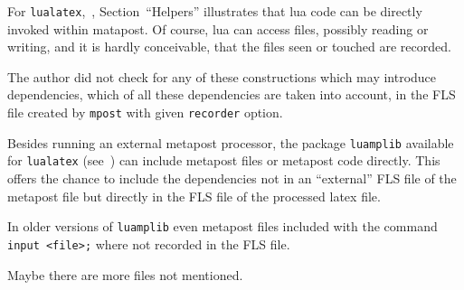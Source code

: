 \documentclass[a4paper, english]{article}%
\begin{document}
For \texttt{lualatex},~\cite{LuaInMp}, 
Section~``Helpers'' illustrates that lua code can be directly invoked within matapost. 
Of course, lua can access files, possibly reading or writing, and it is hardly conceivable, 
that the files seen or touched are recorded. 

The author did not check for any of these constructions which may introduce dependencies, 
which of all these dependencies are taken into account, 
in the FLS file created by \texttt{mpost} with given \texttt{recorder} option. 

Besides running an external metapost processor, 
the package \texttt{luamplib} available for \texttt{lualatex} (see~\cite{LuaMpLib})
can include metapost files or metapost code directly. 
This offers the chance 
to include the dependencies not in an ``external'' FLS file of the metapost file
but directly in the FLS file of the processed latex file. 

In older versions of \texttt{luamplib} 
even metapost files included with the command \texttt{input <file>;} 
where not recorded in the FLS file. 

Maybe there are more files not mentioned. 




{}%
\end{document}
